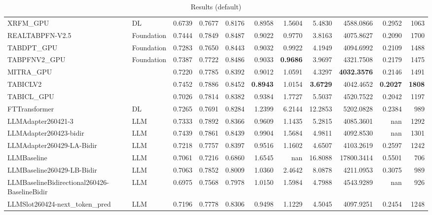 \begin{table}[htbp]
{\begin{tabular}{ll|rrrrrrrr|r}
XRFM\_GPU & DL & 0.6739 & 0.7677 & 0.8176 & 0.8958 & 1.5604 & 5.4830 & 4588.0866 & 0.2952 & 1063 \\
REALTABPFN-V2.5 & Foundation & 0.7444 & 0.7849 & 0.8487 & 0.9022 & 0.9770 & 3.8163 & 4075.8627 & 0.2090 & 1700 \\
TABDPT\_GPU & Foundation & 0.7283 & 0.7650 & 0.8443 & 0.9032 & 0.9922 & 4.1949 & 4094.6992 & 0.2109 & 1488 \\
TABPFNV2\_GPU & Foundation & 0.7387 & 0.7722 & 0.8486 & 0.9033 & \textbf{0.9686} & 3.9697 & 4321.7508 & 0.2179 & 1475 \\
MITRA\_GPU &  & 0.7220 & 0.7785 & 0.8392 & 0.9012 & 1.0591 & 4.3297 & \textbf{4032.3576} & 0.2146 & 1491 \\
TABICLV2 &  & 0.7452 & 0.7886 & 0.8452 & \textbf{0.8943} & 1.0154 & \textbf{3.6729} & 4042.4652 & \textbf{0.2027} & \textbf{1808} \\
TABICL\_GPU &  & 0.7026 & 0.7814 & 0.8382 & 0.9384 & 1.7727 & 5.5037 & 4520.7522 & 0.2042 & 1197 \\
\midrule
FTTransformer & DL & 0.7265 & 0.7691 & 0.8284 & 1.2399 & 6.2144 & 12.2853 & 5202.0828 & 0.2384 & 989 \\
LLMAdapter260421-3 & LLM & 0.7333 & 0.7892 & 0.8366 & 0.9609 & 1.1435 & 5.2815 & 4085.3601 & nan & 1292 \\
LLMAdapter260423-bidir & LLM & 0.7439 & 0.7861 & 0.8439 & 0.9904 & 1.5684 & 4.9811 & 4092.8530 & nan & 1301 \\
LLMAdapter260429-LA-Bidir & LLM & 0.7218 & 0.7757 & 0.8397 & 0.9516 & 1.1602 & 4.6507 & 4103.2619 & 0.2597 & 1242 \\
LLMBaseline & LLM & 0.7061 & 0.7216 & 0.6860 & 1.6545 & nan & 16.8088 & 17800.3414 & 0.5501 & 706 \\
LLMBaseline260429-LB-Bidir & LLM & 0.7063 & 0.7852 & 0.8009 & 1.0360 & 2.4642 & 8.0878 & 4211.0953 & 0.3075 & 989 \\
LLMBaselineBidirectional260426-BaselineBidir & LLM & 0.6975 & 0.7568 & 0.7978 & 1.0150 & 1.5984 & 4.7988 & 4543.9289 & nan & 926 \\
LLMSlot260424-next\_token\_pred & LLM & 0.7196 & 0.7778 & 0.8306 & 0.9498 & 1.1229 & 4.5045 & 4097.9251 & 0.2454 & 1248 \\
\bottomrule
\end{tabular}
}
\caption{Results (default)}
\label{tab:results_default}
\end{table}